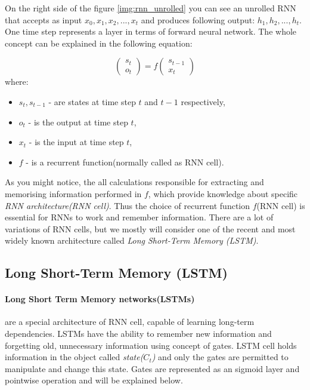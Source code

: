 On the right side of the figure \ref{img:rnn_unrolled} you can see an
unrolled RNN that accepts as input $x_0, x_1, x_2, ..., x_t$ and produces following
output: $h_1, h_2, ..., h_t$. One time step represents a layer in terms
of forward neural network.
The whole concept can be explained in the following
equation:

\begin{equation} \label{eq:rnn_basic}
	\begin{pmatrix}
		s_t \\
		o_t
	\end{pmatrix} = f
	\begin{pmatrix}
		s_{t-1} \\
		x_t
	\end{pmatrix}
\end{equation}
where:
\begin{itemize}
	\item $s_t, s_{t-1}$ - are states at time step $t$ and $t-1$ respectively,
	\item $o_t$ - is the output at time step $t$,
	\item $x_t$ - is the input at time step $t$,
	\item $f$ - is a recurrent function(normally called as RNN cell).
\end{itemize}

As you might notice, the all calculations responsible for extracting and
memorising information performed in $f$, which provide knowledge about
specific \emph{RNN architecture(RNN cell)}.
Thus the choice of recurrent function $f$(RNN cell)
is essential for RNNs to work and remember information. There are a lot of variations
of RNN cells, but we mostly will consider one of the recent and
most widely known architecture called \emph{Long Short-Term Memory (LSTM)}.


\subsection{Long Short-Term Memory (LSTM)}
\paragraph{Long Short Term Memory networks(LSTMs)} are a special architecture of RNN cell,
capable of learning long-term dependencies. \cite{Hochreiter:1997:LSM:1246443.1246450}
LSTMs have the ability to remember new information and forgetting old, unnecessary information
using concept of gates. LSTM cell holds information in the object called \emph{state($C_t$)}
and only the gates are permitted to manipulate and change this state.
Gates are represented as an sigmoid layer and pointwise operation and will be explained
below.

